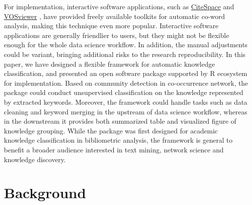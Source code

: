 For implementation, interactive software applications, such as
\href{http://cluster.cis.drexel.edu/~cchen/citespace/}{CiteSpace}
\citep{chen2006citespace} and
\href{https://www.vosviewer.com/}{VOSviewer} \citep{van2010software},
have provided freely available toolkits for automatic co-word analysis,
making this technique even more popular. Interactive software
applications are generally friendlier to users, but they might not be
flexible enough for the whole data science workflow. In addition, the
manual adjustments could be variant, bringing additional risks to the
research reproducibility. In this paper, we have designed a flexible
framework for automatic knowledge classification, and presented an open
software package  supported by R ecosystem for
implementation. Based on community detection in co-occurrence network,
the package could conduct unsupervised classification on the knowledge
represented by extracted keywords. Moreover, the framework could handle
tasks such as data cleaning and keyword merging in the upstream of data
science workflow, whereas in the downstream it provides both summarized
table and visualized figure of knowledge grouping. While the package was
first designed for academic knowledge classification in bibliometric
analysis, the framework is general to benefit a broader audience
interested in text mining, network science and knowledge discovery.

\hypertarget{background}{%
\section{Background}\label{background}}

